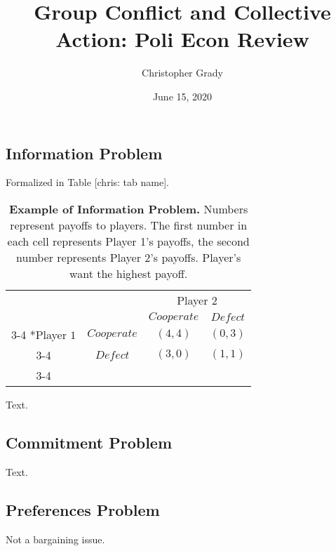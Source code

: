 \documentclass[11pt]{article}
\title{Group Conflict and Collective Action: Poli Econ Review}
\author{
Christopher Grady
}
\date{June 15, 2020}
\begin{document}
\VerbatimFootnotes

%
%
%
%
%
%
%
%
%
%

\maketitle

\hypertarget{information-problem}{%
\subsection{Information Problem}\label{information-problem}}

Formalized in Table {[}chris: tab name{]}.

\begin{table}[h!]
\begin{center}
\setlength{\extrarowheight}{2pt}
\begin{tabular}{cc|c|c|}
    & \multicolumn{1}{c}{} & \multicolumn{2}{c}{Player $2$}\\
    & \multicolumn{1}{c}{} & \multicolumn{1}{c}{$Cooperate$}  & \multicolumn{1}{c}{$Defect$} \\\cline{3-4}
    \multirow{2}*{Player $1$}  & $Cooperate$ & $(4,4)$ & $(0,3)$ \\\cline{3-4}
      & $Defect$ & $(3,0)$ & $(1,1)$ \\\cline{3-4}
\end{tabular}
\caption{\label{tab:infoProb}\textbf{Example of Information Problem.} Numbers represent payoffs to players.  The first number in each cell represents Player 1's payoffs, the second number represents Player 2's payoffs.  Player's want the highest payoff.}
\end{center}
\end{table}

Text.

\hypertarget{commitment-problem}{%
\subsection{Commitment Problem}\label{commitment-problem}}

Text.

\hypertarget{preferences-problem}{%
\subsection{Preferences Problem}\label{preferences-problem}}

Not a bargaining issue.
\end{document}
